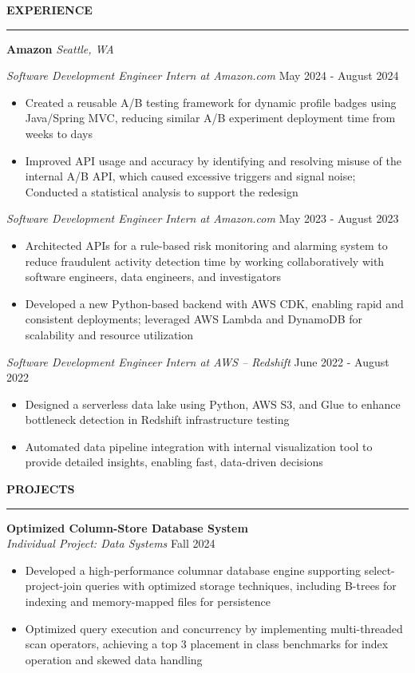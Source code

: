 \documentclass[11pt,a4paper]{article}
\newcommand{\sectionheading}[1]{\vspace{0.2cm}\textbf{\Large #1}\vspace{0.1cm}\hrule\vspace{0.3cm}}
\newcommand{\subheading}[1]{\textbf{#1}}
\newcommand{\daterange}[1]{\hfill{#1}}
\begin{document}
\sectionheading{EXPERIENCE}
\subheading{Amazon} \hfill \textit{Seattle, WA}

\textit{Software Development Engineer Intern at Amazon.com} \daterange{May 2024 - August 2024}
\begin{itemize}[leftmargin=*,nosep]
    \item Created a reusable A/B testing framework for dynamic profile badges using Java/Spring MVC, reducing similar A/B experiment deployment time from weeks to days
    \item Improved API usage and accuracy by identifying and resolving misuse of the internal A/B API, which caused excessive triggers and signal noise; Conducted a statistical analysis to support the redesign
\end{itemize}

\textit{Software Development Engineer Intern at Amazon.com} \daterange{May 2023 - August 2023}
\begin{itemize}[leftmargin=*,nosep]
    \item Architected APIs for a rule-based risk monitoring and alarming system to reduce fraudulent activity detection time by working collaboratively with software engineers, data engineers, and investigators
    \item Developed a new Python-based backend with AWS CDK, enabling rapid and consistent deployments; leveraged AWS Lambda and DynamoDB for scalability and resource utilization
\end{itemize}

\textit{Software Development Engineer Intern at AWS -- Redshift} \daterange{June 2022 - August 2022}
\begin{itemize}[leftmargin=*,nosep]
    \item Designed a serverless data lake using Python, AWS S3, and Glue to enhance bottleneck detection in Redshift infrastructure testing
    \item Automated data pipeline integration with internal visualization tool to provide detailed insights, enabling fast, data-driven decisions
\end{itemize}

\sectionheading{PROJECTS}

\subheading{Optimized Column-Store Database System}\\
\textit{Individual Project: Data Systems} \daterange{Fall 2024}
\begin{itemize}[leftmargin=*,nosep]
    \item Developed a high-performance columnar database engine supporting select-project-join queries with optimized storage techniques, including B-trees for indexing and memory-mapped files for persistence
    \item Optimized query execution and concurrency by implementing multi-threaded scan operators, achieving a top 3 placement in class benchmarks for index operation and skewed data handling
\end{itemize}
\end{document}

